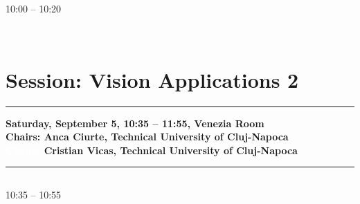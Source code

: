 \vspace*{-36pt}\subsection[ 
    	   {\bf Towards a realistic traffic and driving simulation using 3D rendering
           } \\
           {\it Alexander Paz, Hanns de la Fuente, Naveen Veeramisti, Luiza Modorcea, Heather Monteiro
           }
	]
	    {
            }
            $ $ 
            
	    10:00 -- 10:20 \nopagebreak

            
            \\ 


\section{{\bf \large Session: %
Vision Applications 2
}} \vspace{-15pt} %
\noindent\rule{\textwidth}{0.4pt} \nopagebreak
{\bf  
Saturday, September 5, 10:35 -- 11:55, Venezia Room
} \\ \nopagebreak
{\bf  Chairs: 
Anca Ciurte, Technical University of Cluj-Napoca
} \\ \nopagebreak 
{\bf  \textcolor{white}{Chairs:} 
Cristian Vicas, Technical University of Cluj-Napoca
} \\ \nopagebreak 
\noindent\rule{\textwidth}{0.4pt} \nopagebreak


\vspace*{-36pt}\subsection[ 
    	   {\bf Estimation of object's integral brightness 
           } \\
           {\it Kristina Zipa, Alexey Ignatenko
           }
	]
	    {
            }
	    10:35 -- 10:55 \nopagebreak

